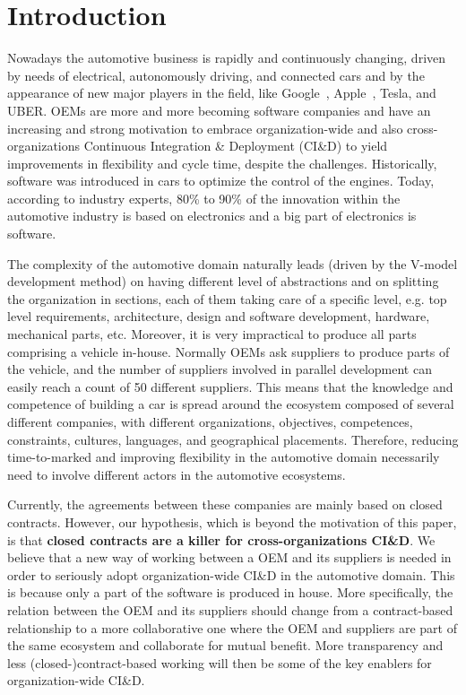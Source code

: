\section{Introduction}\label{sec:intro}


Nowadays the automotive business is rapidly and continuously changing, driven by needs of 
electrical, autonomously driving, and connected cars and by the appearance of new major players in
the field, like Google~\cite{Google}, Apple~\cite{Apple,Apple2}, Tesla, and UBER.
OEMs are more and more becoming software companies 
and have an increasing and strong motivation
to embrace organization-wide and also cross-organizations Continuous Integration \& Deployment (CI\&D) to yield improvements
in flexibility and cycle time, despite the challenges.
Historically, software was introduced in cars
to optimize the control of the engines. 
Today, according to industry experts, 80\%
to 90\% of the innovation within the automotive industry is
based on electronics and a big part of electronics is software. 

The complexity of the automotive domain naturally leads (driven by the V-model development method) on having different level of abstractions and on splitting the organization in sections, each of them taking care of a specific level, e.g. top level requirements,
architecture, design and software development, hardware, mechanical parts, etc. 
Moreover, it is very impractical to produce all parts comprising a vehicle in-house. Normally OEMs 
ask suppliers to produce parts of the vehicle, and the number of suppliers involved in parallel development can easily
reach a count of 50 different suppliers. 
This means that the knowledge and competence of building a car is spread around the ecosystem composed of several different companies, with different organizations, objectives, competences, constraints, cultures, languages, and geographical placements. 
Therefore, reducing time-to-marked and improving flexibility in the automotive domain necessarily need to involve different actors in the automotive ecosystems.

Currently, the agreements between these companies are mainly based on closed contracts. 
However, our hypothesis, which is beyond the motivation of this paper, is that {\bf closed contracts are a killer for cross-organizations CI\&D}.
We believe that a new way of working between a OEM and its
suppliers is needed in order to seriously adopt organization-wide CI\&D in the automotive domain. This is because only a part of the software is produced in house.
More specifically, the relation between the OEM and its suppliers should change from a contract-based relationship to a more
collaborative one where the OEM and suppliers are part
of the same ecosystem and collaborate for mutual benefit.
More transparency and less (closed-)contract-based working will then
be some of the key enablers for organization-wide CI\&D.

